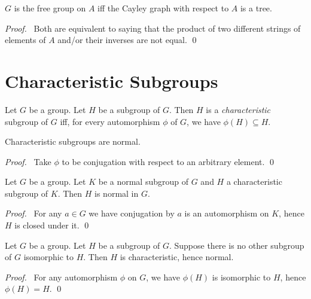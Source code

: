 \begin{prop}
$G$ is the free group on $A$ iff the Cayley graph with respect to $A$ is a tree.
\end{prop}

\begin{proof}
\pf\ Both are equivalent to saying that the product of two different strings of elements of $A$ and/or their inverses are not equal. \qed
\end{proof}

\section{Characteristic Subgroups}

\begin{df}
Let $G$ be a group. Let $H$ be a subgroup of $G$. Then $H$ is a \emph{characteristic} subgroup of $G$ iff, for every automorphism $\phi$ of $G$, we have $\phi(H) \subseteq H$.
\end{df}

\begin{prop}
Characteristic subgroups are normal.
\end{prop}

\begin{proof}
\pf\ Take $\phi$ to be conjugation with respect to an arbitrary element. \qed
\end{proof}

\begin{prop}
Let $G$ be a group. Let $K$ be a normal subgroup of $G$ and $H$ a characteristic subgroup of $K$. Then $H$ is normal in $G$.
\end{prop}

\begin{proof}
\pf\ For any $a \in G$ we have conjugation by $a$ is an automorphism on $K$, hence $H$ is closed under it. \qed
\end{proof}

\begin{prop}
\label{prop:unique-subgroup-normal}
Let $G$ be a group. Let $H$ be a subgroup of $G$. Suppose there is no other subgroup of $G$ isomorphic to $H$. Then $H$ is characteristic, hence normal.
\end{prop}

\begin{proof}
\pf\ For any automorphism $\phi$ on $G$, we have $\phi(H)$ is isomorphic to $H$, hence $\phi(H) = H$. \qed
\end{proof}


